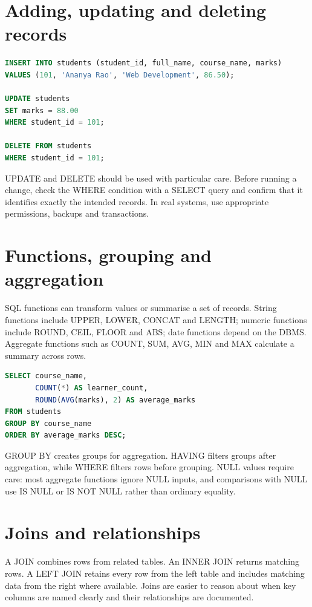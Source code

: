 \documentclass[11pt,openany,oneside]{book}
\begin{document}
\section{Adding, updating and deleting records}
\begin{lstlisting}[style=webcode,language=SQL]
INSERT INTO students (student_id, full_name, course_name, marks)
VALUES (101, 'Ananya Rao', 'Web Development', 86.50);

UPDATE students
SET marks = 88.00
WHERE student_id = 101;

DELETE FROM students
WHERE student_id = 101;
\end{lstlisting}
UPDATE and DELETE should be used with particular care. Before running a change, check the WHERE condition with a SELECT query and confirm that it identifies exactly the intended records. In real systems, use appropriate permissions, backups and transactions.

\section{Functions, grouping and aggregation}
SQL functions can transform values or summarise a set of records. String functions include UPPER, LOWER, CONCAT and LENGTH; numeric functions include ROUND, CEIL, FLOOR and ABS; date functions depend on the DBMS. Aggregate functions such as COUNT, SUM, AVG, MIN and MAX calculate a summary across rows.

\begin{lstlisting}[style=webcode,language=SQL]
SELECT course_name,
       COUNT(*) AS learner_count,
       ROUND(AVG(marks), 2) AS average_marks
FROM students
GROUP BY course_name
ORDER BY average_marks DESC;
\end{lstlisting}
GROUP BY creates groups for aggregation. HAVING filters groups after aggregation, while WHERE filters rows before grouping. NULL values require care: most aggregate functions ignore NULL inputs, and comparisons with NULL use IS NULL or IS NOT NULL rather than ordinary equality.

\section{Joins and relationships}
A JOIN combines rows from related tables. An INNER JOIN returns matching rows. A LEFT JOIN retains every row from the left table and includes matching data from the right where available. Joins are easier to reason about when key columns are named clearly and their relationships are documented.
\end{document}
